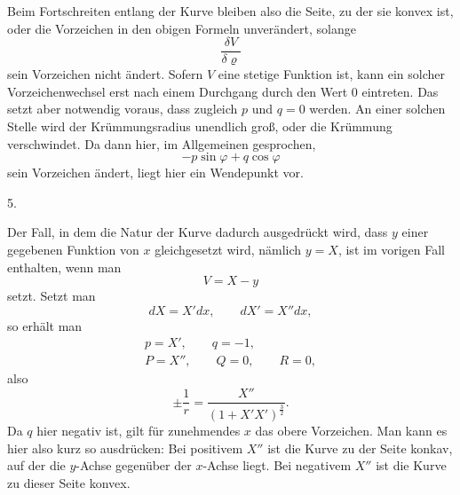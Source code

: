 \par{}%
\noindent\hspace*{1.2em}Beim Fortschreiten entlang der Kurve bleiben also die Seite, zu der sie konvex ist, oder die Vorzeichen in den obigen Formeln unverändert, solange
\[
\frac{\delta V}{\delta\varrho}
\]
sein Vorzeichen nicht ändert. Sofern $V$ eine stetige Funktion ist, kann ein solcher Vorzeichenwechsel erst nach einem Durchgang durch den Wert $0$ eintreten. Das setzt aber notwendig voraus, dass zugleich $p$ und $q=0$ werden. An einer solchen Stelle wird der Krümmungsradius unendlich groß, oder die Krümmung verschwindet. Da dann hier, im Allgemeinen gesprochen,
\[
-p\sin\varphi+q\cos\varphi
\]
sein Vorzeichen ändert, liegt hier ein Wendepunkt vor.

\begin{center}5.\end{center}
\noindent\hspace*{1.2em}Der Fall, in dem die Natur der Kurve dadurch ausgedrückt wird, dass $y$ einer gegebenen Funktion von $x$ gleichgesetzt wird, nämlich $y=X$, ist im vorigen Fall enthalten, wenn man
\[
V=X-y
\]
setzt. Setzt man
\[
dX=X'dx,\qquad dX'=X''dx,
\]
so erhält man
\[
\begin{gathered}
p=X',\qquad q=-1,\\
P=X'',\qquad Q=0,\qquad R=0,
\end{gathered}
\]
also
\[
\pm\frac1r=\frac{X''}{(1+X'X')^{\frac32}}.
\]
Da $q$ hier negativ ist, gilt für zunehmendes $x$ das obere Vorzeichen. Man kann es hier also kurz so ausdrücken: Bei positivem $X''$ ist die Kurve zu der Seite konkav, auf der die $y$-Achse gegenüber der $x$-Achse liegt. Bei negativem $X''$ ist die Kurve zu dieser Seite konvex.
